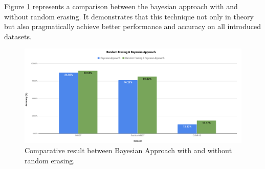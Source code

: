 Figure \ref{fig:random_erasiong_result} represents a comparison between the bayesian approach with and without random erasing. It demonstrates that this technique not only in theory but also pragmatically achieve better performance and accuracy on all introduced datasets.


\begin{figure}
  \centering
  \label{fig:random_erasiong_result}
  \includegraphics[width=1\textwidth]{fig/contribution/random-erasing-result}
  \caption{Comparative result between Bayesian Approach with and without random erasing.}
\end{figure}